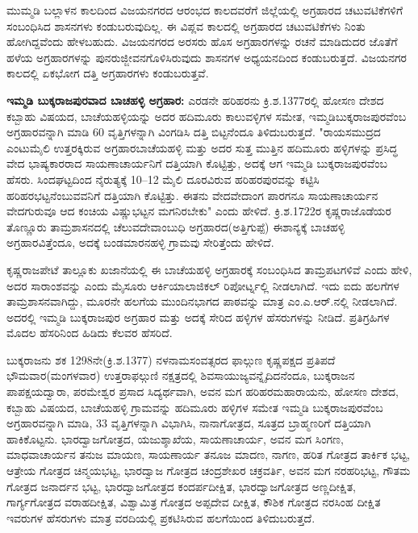 ಮುಮ್ಮಡಿ ಬಲ್ಲಾಳನ ಕಾಲದಿಂದ ವಿಜಯನಗರದ ಆರಂಭದ ಕಾಲದವರೆಗೆ ಜಿಲ್ಲೆಯಲ್ಲಿ ಅಗ್ರಹಾರದ ಚಟುವಟಿಕೆಗಳಿಗೆ ಸಂಬಂಧಿಸಿದ ಶಾಸನಗಳು ಕಂಡುಬರುವುದಿಲ್ಲ. ಈ ವಿಪ್ಲವ ಕಾಲದಲ್ಲಿ ಅಗ್ರಹಾರದ ಚಟುವಟಿಕೆಗಳು ನಿಂತು ಹೋಗಿದ್ದವೆಂದು ಹೇಳಬಹುದು. ವಿಜಯನಗರದ ಅರಸರು ಹೊಸ ಅಗ್ರಹಾರಗಳನ್ನು ರಚನೆ ಮಾಡಿದುದರ ಜೊತೆಗೆ ಹಳೆಯ ಅಗ್ರಹಾರಗಳನ್ನು ಪುನರುಜ್ಜೀವನಗೊಳಿಸಿರುವುದು ಶಾಸನಗಳ ಅಧ್ಯಯನದಿಂದ ಕಂಡುಬರುತ್ತದೆ. ವಿಜಯನಗರ ಕಾಲದಲ್ಲಿ ಏಕಭೋಗ ದತ್ತಿ ಅಗ್ರಹಾರಗಳು ಕಂಡುಬರುತ್ತವೆ.

\textbf{ಇಮ್ಮಡಿ ಬುಕ್ಕರಾಜಪುರವಾದ ಬಾಚಹಳ್ಳಿ ಅಗ್ರಹಾರ: }ಎರಡನೇ ಹರಿಹರನು ಕ್ರಿ.ಶ.1377ರಲ್ಲಿ ಹೋಸಣ ದೇಶದ ಕಬ್ಬಾಹು ವಿಷಯದ, ಬಾಚೆಯಹಳ್ಳಿಯನ್ನು ಅದರ ಹದಿಮೂರು ಕಾಲುವಳ್ಳಿಗಳ ಸಮೇತ, ಇಮ್ಮಡಿಬುಕ್ಕರಾಜಪುರವೆಂಬ ಅಗ್ರಹಾರವನ್ನಾಗಿ ಮಾಡಿ 60 ವೃತ್ತಿಗಳನ್ನಾಗಿ ವಿಂಗಡಿಸಿ ದತ್ತಿ ಬಿಟ್ಟನೆಂದೂ ತಿಳಿದುಬರುತ್ತದೆ. "ರಾಯಸಮುದ್ರದ ಎಂಟುಮೈಲಿ ಉತ್ತರಕ್ಕಿರುವ ಅಗ್ರಹಾರಬಾಚೆಯಹಳ್ಳಿ ಮತ್ತು ಅದರ ಸುತ್ತ ಮುತ್ತಿನ ಹದಿಮೂರು ಹಳ್ಳಿಗಳನ್ನು ಪ್ರಸಿದ್ಧ ವೇದ ಭಾಷ್ಯಕಾರರಾದ ಸಾಯಣಾಚಾರ್ಯನಿಗೆ ದತ್ತಿಯಾಗಿ ಕೊಟ್ಟಿತ್ತು, ಅದಕ್ಕೆ ಆಗ ಇಮ್ಮಡಿ ಬುಕ್ಕರಾಜಪುರವೆಂಬ ಹೆಸರು. ಸಿಂದಘಟ್ಟದಿಂದ ನೈರುತ್ಯಕ್ಕೆ 10–12 ಮೈಲಿ ದೂರವಿರುವ ಹರಿಹರಪುರವನ್ನು ಕಟ್ಟಿಸಿ ಹರಿಹರಭಟ್ಟನೆಂಬುವವನಿಗೆ ದತ್ತಿಯಾಗಿ ಕೊಟ್ಟಿತ್ತು. ಈತನು ವೇದವೇದಾಂಗ ಪಾರಗನೂ ಸಾಯಣಾಚಾರ್ಯನ ವೇದಗುರುವೂ ಆದ ಕಂಚಿಯ ವಿಷ್ಣುಭಟ್ಟನ ಮಗನಿರಬೇಕು" ಎಂದು ಹೇಳಿದೆ. ಕ್ರಿ.ಶ.1722ರ ಕೃಷ್ಣರಾಜೊಡೆಯರ ತೊಣ್ಣೂರು ತಾಮ್ರಶಾಸನದಲ್ಲಿ ಚೆಲುವದೇವಾಂಬುಧಿ ಅಗ್ರಹಾರದ(ಅತ್ತಿಗುಪ್ಪೆ) ಈಶಾನ್ಯಕ್ಕೆ ಬಾಚಹಳ್ಳಿ ಅಗ್ರಹಾರವಿತ್ತೆಂದೂ, ಅದಕ್ಕೆ ಬಂಡಮಾರನಹಳ್ಳಿ ಗ್ರಾಮವು ಸೇರಿತ್ತೆಂದು ಹೇಳಿದೆ.

ಕೃಷ್ಣರಾಜಪೇಟೆ ತಾಲ್ಲೂಕು ಖಜಾನೆಯಲ್ಲಿ ಈ ಬಾಚೆಯಹಳ್ಳಿ ಅಗ್ರಹಾರಕ್ಕೆ ಸಂಬಂಧಿಸಿದ ತಾಮ್ರಪಟಗಳಿವೆ ಎಂದು ಹೇಳಿ, ಅದರ ಸಾರಾಂಶವನ್ನು ಎಂದು ಮೈಸೂರು ಆರ್ಕಿಯಾಲಾಜಿಕಲ್​ ರಿಪೋರ್ಟ್ನಲ್ಲಿ ನೀಡಲಾಗಿದೆ. ಇದು ಐದು ಹಲಗೆಗಳ ತಾಮ್ರಶಾಸನವಾಗಿದ್ದು, ಮೂರನೇ ಹಲಗೆಯ ಮುಂದಿನಭಾಗದ ಪಾಠವನ್ನು ಮಾತ್ರ ಎಂ.ಎ.ಆರ್​.ನಲ್ಲಿ ನೀಡಲಾಗಿದೆ. ಅದರಲ್ಲಿ ಇಮ್ಮಡಿ ಬುಕ್ಕರಾಜಪುರ ಅಗ್ರಹಾರ ಮತ್ತು ಅದಕ್ಕೆ ಸೇರಿದ ಹಳ್ಳಿಗಳ ಹೆಸರುಗಳನ್ನು ನೀಡಿದೆ. ಪ್ರತಿಗ್ರಹಿಗಳ ಮೊದಲ ಹೆಸರಿನಿಂದ ಹಿಡಿದು ಕೆಲವರ ಹೆಸರಿದೆ.

ಬುಕ್ಕರಾಜನು ಶಕ 1298ನೇ(ಕ್ರಿ.ಶ.1377) ನಳನಾಮಸಂವತ್ಸರದ ಫಾಲ್ಗುಣ ಕೃಷ್ಣಪಕ್ಷದ ಪ್ರತಿಪದೆ ಭೌಮವಾರ(ಮಂಗಳವಾರ) ಉತ್ತರಾಫಲ್ಗುಣಿ ನಕ್ಷತ್ರದಲ್ಲಿ ಶಿವಸಾಯುಜ್ಯವನ್ನೈದಿದನೆಂದೂ, ಬುಕ್ಕರಾಜನ ಪಾಪಕ್ಷಯದ್ವಾರಾ, ಪರಮೇಶ್ವರ ಪ್ರಸಾದ ಸಿದ್ಯರ್ಥವಾಗಿ, ಅವನ ಮಗ ಹರಿಹರಮಹಾರಾಯನು, ಹೋಸಣ ದೇಶದ, ಕಬ್ಬಾಹು ವಿಷಯದ, ಬಾಚೆಯಹಳ್ಳಿ ಗ್ರಾಮವನ್ನು ಹದಿಮೂರು ಹಳ್ಳಿಗಳ ಸಮೇತ ಇಮ್ಮಡಿ ಬುಕ್ಕರಾಜಪುರವೆಂಬ ಅಗ್ರಹಾರವನ್ನಾಗಿ ಮಾಡಿ, 33 ವೃತ್ತಿಗಳನ್ನಾಗಿ ವಿಭಾಗಿಸಿ, ನಾನಾಗೋತ್ರದ, ಸೂತ್ರದ ಬ್ರಾಹ್ಮಣರಿಗೆ ದತ್ತಿಯಾಗಿ ಹಾಕಿಕೊಟ್ಟನು. ಭಾರದ್ವಾಜಗೋತ್ರದ, ಯಜುಶ್ಶಾಖೆಯ, ಸಾಯಣಾಚಾರ್ಯ, ಅವನ ಮಗ ಸಿಂಗಣ, ಮಾಧವಾಚಾರ್ಯನ ತನುಜ ಮಾಯಣ, ಸಾಯಣಾರ್ಯ ತನೂಜ ಮಾದಣ, ನಾಗಣ, ಹರಿತ ಗೋತ್ರದ ತಾರ್ಕಿಕ ಭಟ್ಟ, ಆತ್ರೇಯ ಗೋತ್ರದ ಚಿನ್ಮಯಭಟ್ಟ, ಭಾರದ್ವಾಜ ಗೋತ್ರದ ಚಂದ್ರಶೇಖರ ಚಕ್ರವರ್ತಿ, ಅವನ ಮಗ ನರಹರಿಭಟ್ಟ, ಗೌತಮ ಗೋತ್ರದ ಜನಾರ್ದನ ಭಟ್ಟ, ಭಾರದ್ವಾಜಗೋತ್ರದ ಕಂದರ್ಪದೀಕ್ಷಿತ, ಭಾರದ್ವಾಜಗೋತ್ರದ ಅಣ್ಣದೀಕ್ಷಿತ, ಗಾರ್ಗ್ಯಗೋತ್ರದ ವರಾಹದೀಕ್ಷಿತ, ವಿಶ್ವಾಮಿತ್ರ ಗೋತ್ರದ ಅಪ್ಪದೇವ ದೀಕ್ಷಿತ, ಕೌಶಿಕ ಗೋತ್ರದ ನರಸಿಂಹ ದೀಕ್ಷಿತ ಇವರುಗಳ ಹೆಸರುಗಳು ಮಾತ್ರ ವರದಿಯಲ್ಲಿ ಪ್ರಕಟಿಸಿರುವ ಹಲಗೆಯಿಂದ ತಿಳಿದುಬರುತ್ತದೆ.


